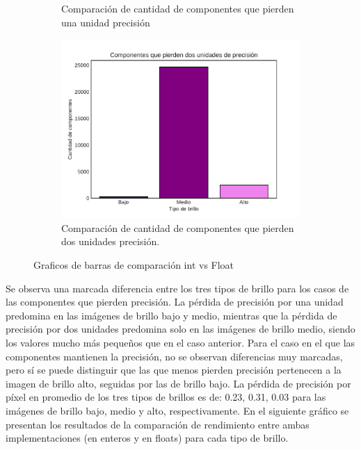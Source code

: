 \documentclass[a4paper]{article}
\begin{document}
\begin{figure}[h]
\begin{subfigure}{0.49 \textwidth}
		\caption{Comparación de cantidad de componentes que pierden una unidad precisión}
	\end{subfigure}
	\centering
	\begin{subfigure}{0.49 \textwidth}
		\includegraphics[width=\textwidth]{img/Precision2.pdf}
		\caption{Comparación de cantidad de componentes que pierden dos unidades precisión.}
	\end{subfigure}
	\caption{Graficos de barras de comparación int vs Float}
\end{figure}
\justify
Se observa una marcada diferencia entre los tres tipos de brillo para los casos de las componentes que pierden precisión. La pérdida de precisión por una unidad predomina en las imágenes de brillo bajo y medio, mientras que la pérdida de precisión por dos unidades predomina solo en las imágenes de brillo medio, siendo los valores mucho más pequeños que en el caso anterior.
\justify
Para el caso en el que las componentes mantienen la precisión, no se observan diferencias muy marcadas, pero sí se puede distinguir que las que menos pierden precisión pertenecen a la imagen de brillo alto, seguidas por las de brillo bajo. La pérdida de precisión por píxel en promedio de los tres tipos de brillos es de: 0.23, 0.31, 0.03 para las imágenes de brillo bajo, medio y alto, respectivamente.
\justify
En el siguiente gráfico se presentan los resultados de la comparación de rendimiento entre ambas implementaciones (en enteros y en floats) para cada tipo de brillo. 
\end{document}
